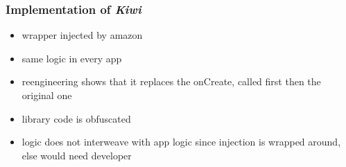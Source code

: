 \subsubsection{Implementation of \textit{Kiwi}} \label{section:license-amazon-implementation}
\begin{itemize}
    \item wrapper injected by amazon
    \item same logic in every app
    \item reengineering shows that it replaces the onCreate, called first then the original one
    \item library code is obfuscated
    \item logic does not interweave with app logic since injection is wrapped around, else would need developer
\end{itemize}
